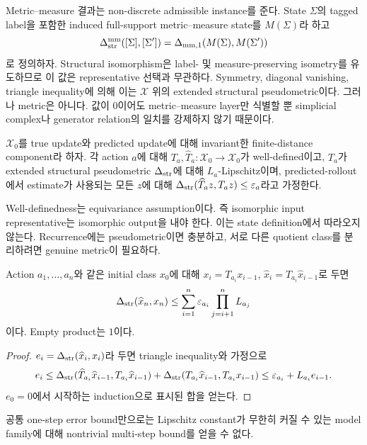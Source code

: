 Metric--measure 결과는 non-discrete admissible instance를 준다. State $\Sigma$의
tagged label을 포함한 induced full-support metric--measure state를 $M(\Sigma)$라
하고
\[
\Delta_{\mathrm{str}}^{\mathrm{mm}}([\Sigma],[\Sigma'])
=\Delta_{\mathrm{mm},1}(M(\Sigma),M(\Sigma'))
\]
로 정의하자. Structural isomorphism은 label- 및 measure-preserving isometry를
유도하므로 이 값은 representative 선택과 무관하다. Symmetry, diagonal vanishing,
triangle inequality에 의해 이는 $\mathcal X$ 위의 extended structural
pseudometric이다. 그러나 metric은 아니다. 값이 0이어도 metric--measure layer만
식별할 뿐 simplicial complex나 generator relation의 일치를 강제하지 않기 때문이다.

\begin{assumption}
$\mathcal X_0$를 true update와 predicted update에 대해 invariant한
finite-distance component라 하자. 각 action $a$에 대해
$T_a,\widehat T_a:\mathcal X_0\to\mathcal X_0$가 well-defined이고,
$T_a$가 extended structural pseudometric $\Delta_{\mathrm{str}}$에 대해 $L_a$-Lipschitz이며,
predicted-rollout에서 estimate가 사용되는 모든 $z$에 대해
$\Delta_{\mathrm{str}}(\widehat T_a z,T_a z)\leq\varepsilon_a$라고 가정한다.
\end{assumption}

Well-definedness는 equivariance assumption이다. 즉 isomorphic input
representative는 isomorphic output을 내야 한다. 이는 state definition에서
따라오지 않는다. Recurrence에는 pseudometric이면 충분하고, 서로 다른
quotient class를 분리하려면 genuine metric이 필요하다.

\begin{theorem}
Action $a_1,\ldots,a_n$와 같은 initial class $x_0$에 대해
$x_i=T_{a_i}x_{i-1}$, $\widehat x_i=\widehat T_{a_i}\widehat x_{i-1}$로
두면
\[
\Delta_{\mathrm{str}}(\widehat x_n,x_n)\leq
\sum_{i=1}^n\varepsilon_{a_i}\prod_{j=i+1}^nL_{a_j}
\]
이다. Empty product는 $1$이다.
\end{theorem}

\begin{proof}
$e_i=\Delta_{\mathrm{str}}(\widehat x_i,x_i)$라 두면 triangle inequality와 가정으로
\[
e_i\leq\Delta_{\mathrm{str}}(\widehat T_{a_i}\widehat x_{i-1},T_{a_i}\widehat x_{i-1})+
\Delta_{\mathrm{str}}(T_{a_i}\widehat x_{i-1},T_{a_i}x_{i-1})\leq\varepsilon_{a_i}+L_{a_i}e_{i-1}.
\]
$e_0=0$에서 시작하는
induction으로 표시된 합을 얻는다.
\end{proof}

\begin{proposition}
공통 one-step error bound만으로는 Lipschitz constant가 무한히 커질 수
있는 model family에 대해 nontrivial multi-step bound를 얻을 수 없다.
\end{proposition}

